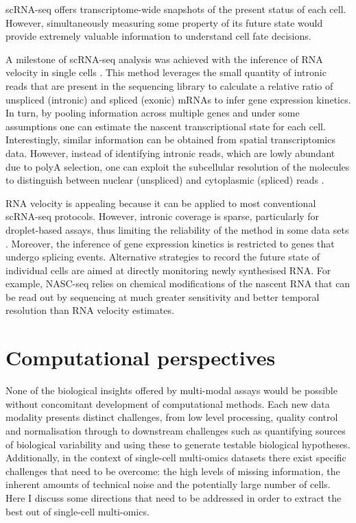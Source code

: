 scRNA-seq offers transcriptome-wide snapshots of the present status of each cell. However, simultaneously measuring some property of its future state would provide extremely valuable information to understand cell fate decisions. 

A milestone of scRNA-seq analysis was achieved with the inference of RNA velocity in single cells \cite{LaManno2018}. This method leverages the small quantity of intronic reads that are present in the sequencing library to calculate a relative ratio of unspliced (intronic) and spliced (exonic) mRNAs to infer gene expression kinetics. In turn, by pooling information across multiple genes and under some assumptions one can estimate the nascent transcriptional state for each cell. Interestingly, similar information can be obtained from spatial transcriptomics data. However, instead of identifying intronic reads, which are lowly abundant due to polyA selection, one can exploit the subcellular resolution of the molecules to distinguish between nuclear (unspliced) and cytoplasmic (spliced) reads \cite{Xia2019}.

RNA velocity is appealing because it can be applied to most conventional scRNA-seq protocols. However, intronic coverage is sparse, particularly for droplet-based assays, thus limiting the reliability of the method in some data sets \cite{Soneson2020}. Moreover, the inference of gene expression kinetics is restricted to genes that undergo splicing events. Alternative strategies to record the future state of individual cells are aimed at directly monitoring newly synthesised RNA. For example, NASC-seq \cite{Hendriks2019} relies on chemical modifications of the nascent RNA that can be read out by sequencing at much greater sensitivity and better temporal resolution than RNA velocity estimates.



\section{Computational perspectives} 

None of the biological insights offered by multi-modal assays would be possible without concomitant development of computational methods. Each new data modality presents distinct challenges, from low level processing, quality control and normalisation through to downstream challenges such as quantifying sources of biological variability and using these to generate testable biological hypotheses. Additionally, in the context of single-cell multi-omics datasets there exist specific challenges that need to be overcome: the high levels of missing information, the inherent amounts of technical noise and the potentially large number of cells. Here I discuss some directions that need to be addressed in order to extract the best out of single-cell multi-omics.

